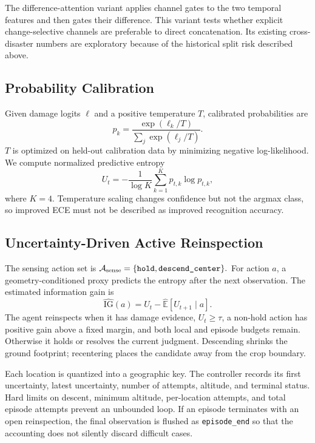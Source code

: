 The difference-attention variant applies channel gates to the two temporal features and then gates their difference.
This variant tests whether explicit change-selective channels are preferable to direct concatenation.
Its existing cross-disaster numbers are exploratory because of the historical split risk described above.

\subsection{Probability Calibration}
Given damage logits \(\ell\) and a positive temperature \(T\), calibrated probabilities are
\begin{equation}
 p_k = \frac{\exp(\ell_k/T)}
 {\sum_j \exp(\ell_j/T)} .
\end{equation}
\(T\) is optimized on held-out calibration data by minimizing negative log-likelihood.
We compute normalized predictive entropy
\begin{equation}
 U_t = -\frac{1}{\log K}\sum_{k=1}^{K}p_{t,k}\log p_{t,k},
 \label{eq:entropy}
\end{equation}
where \(K=4\).
Temperature scaling changes confidence but not the argmax class, so improved ECE must not be described as improved recognition accuracy.

\subsection{Uncertainty-Driven Active Reinspection}
The sensing action set is
\(
\mathcal{A}_{\mathrm{sense}}=\{\texttt{hold},\texttt{descend\_center}\}.
\)
For action \(a\), a geometry-conditioned proxy predicts the entropy after the next observation.
The estimated information gain is
\begin{equation}
 \widehat{\mathrm{IG}}(a)
 = U_t-\widehat{\mathbb{E}}[U_{t+1}\mid a].
\end{equation}
The agent reinspects when it has damage evidence, \(U_t\geq\tau\), a non-hold action has positive gain above a fixed margin, and both local and episode budgets remain.
Otherwise it holds or resolves the current judgment.
Descending shrinks the ground footprint; recentering places the candidate away from the crop boundary.

Each location is quantized into a geographic key.
The controller records its first uncertainty, latest uncertainty, number of attempts, altitude, and terminal status.
Hard limits on descent, minimum altitude, per-location attempts, and total episode attempts prevent an unbounded loop.
If an episode terminates with an open reinspection, the final observation is flushed as \texttt{episode\_end} so that the accounting does not silently discard difficult cases.

